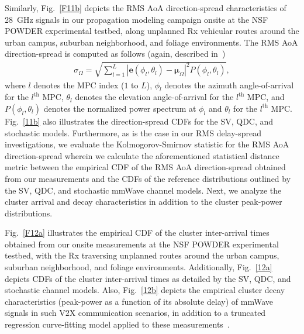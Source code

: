 \documentclass[12pt, draftcls, onecolumn]{IEEEtran}
\begin{document}
{Similarly, Fig.~\ref{F11b} depicts the RMS AoA direction-spread characteristics of \SI{28}{\giga\hertz} signals in our propagation modeling campaign onsite at the NSF POWDER experimental testbed, along unplanned Rx vehicular routes around the urban campus, suburban neighborhood, and foliage environments. The RMS AoA direction-spread is computed as follows (again, described in~\cite{Indoor60G})
\begin{align}\label{RMS_DirS}
    \sigma_{\Omega} = \sqrt{\sum_{l=1}^{L}|\mathbf{e}(\phi_{l}, \theta_{l}) - \boldsymbol{\mu}_{\Omega}|^{2}P(\phi_{l}, \theta_{l})},
\end{align}
where $l$ denotes the MPC index ($1$ to $L$), $\phi_{l}$ denotes the azimuth angle-of-arrival for the $l^{\mathrm{th}}$ MPC, $\theta_{l}$ denotes the elevation angle-of-arrival for the $l^{\mathrm{th}}$ MPC, and $P(\phi_{l}, \theta_{l})$ denotes the normalized power spectrum at $\phi_{l}$ and $\theta_{l}$ for the $l^{\mathrm{th}}$ MPC. Fig.~\ref{11b} also illustrates the direction-spread CDFs for the SV, QDC, and stochastic models. Furthermore, as is the case in our RMS delay-spread investigations, we evaluate the Kolmogorov-Smirnov statistic for the RMS AoA direction-spread wherein we calculate the aforementioned statistical distance metric between the empirical CDF of the RMS AoA direction-spread obtained from our measurements and the CDFs of the reference distributions outlined by the SV, QDC, and stochastic mmWave channel models. Next, we analyze the cluster arrival and decay characteristics in addition to the cluster peak-power distributions.

Fig.~\ref{F12a} illustrates the empirical CDF of the cluster inter-arrival times obtained from our onsite measurements at the NSF POWDER experimental testbed, with the Rx traversing unplanned routes around the urban campus, suburban neighborhood, and foliage environments. Additionally, Fig.~\ref{12a} depicts CDFs of the cluster inter-arrival times as detailed by the SV, QDC, and stochastic channel models. Also, Fig.~\ref{12b} depicts the empirical cluster decay characteristics (peak-power as a function of its absolute delay) of mmWave signals in such V$2$X communication scenarios, in addition to a truncated regression curve-fitting model applied to these measurements~\cite{Indoor60G}.

}
\end{document}
